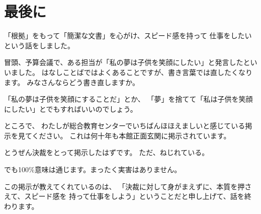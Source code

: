 \documentclass[uplatex,jis2004,dvipdfmx,12pt]{jsarticle}
\begin{document}
\section{最後に}
「根拠」をもって「簡潔な文書」を心がけ、スピード感を持って
仕事をしたいという話をしました。



冒頭、予算会議で、ある担当が「私の夢は子供を笑顔にしたい」と発言したとい
いました。
はなしことばではよくあることですが、書き言葉では直したくなります。
みなさんならどう書き直しますか。

「私の夢は子供を笑顔にすることだ」とか、
「夢」を捨てて「私は子供を笑顔にしたい」とでもすればいいのでしょう。

ところで、
わたしが総合教育センターでいちばんほほえましいと感じている掲示を見てください。
これは何十年も本館正面玄関に掲示されています。

とうぜん決裁をとって掲示したはずです。
ただ、ねじれている。

でも100\%意味は通じます。まったく実害はありません。


この掲示が教えてくれているのは、
「決裁に対して身がまえずに、本質を押さえて、スピード感を
持って仕事をしよう」ということだと申し上げて、話を終わります。
\end{document}
